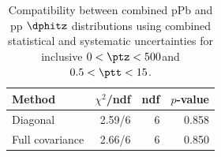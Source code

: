 \begin{table}[htp!]
\centering
\begin{tabular}{|l|r|r|r|}
\hline
Method & $\chi^2$/ndf & ndf & $p$-value \\
\hline
Diagonal & 2.59/6 & 6 & 0.858 \\
Full covariance & 2.66/6 & 6 & 0.850 \\
\hline
\end{tabular}
\caption{Compatibility between combined pPb and pp $\dphitz$ distributions using combined statistical and systematic uncertainties for inclusive $0 < \ptz < 500$\GeV and $0.5 < \ptt < 15$\GeV.}
\label{table:chisq_dphi}
\end{table}
